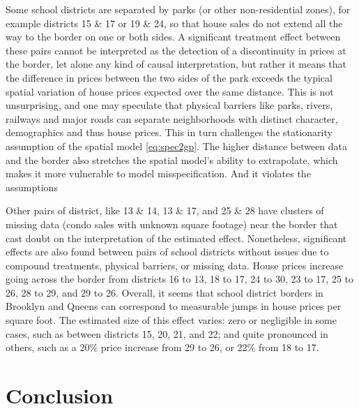 \documentclass[letter,12pt]{article}
\begin{document}
Some school districts are separated by parks (or other non-residential zones), for example districts 15 \& 17 or 19 \& 24, so that house sales do not extend all the way to the border on one or both sides.
A significant treatment effect between these pairs cannot be interpreted as the detection of a discontinuity in prices at the border, let alone any kind of causal interpretation, but rather it means that the difference in prices between the two sides of the park exceeds the typical spatial variation of house prices expected over the same distance.
This is not unsurprising, and one may speculate that physical barriers like parks, rivers, railways and major roads can separate neighborhoods with distinct character, demographics and thus house prices.
This in turn challenges the stationarity assumption of the spatial model \eqref{eq:spec2gp}.
The higher distance between data and the border also stretches the spatial model's ability to extrapolate, which makes it more vulnerable to model misspecification.
And it violates the assumptions




Other pairs of district, like 13 \& 14, 13 \& 17, and 25 \& 28 have clusters of missing data (condo sales with unknown square footage) near the border that cast doubt on the interpretation of the estimated effect.
Nonetheless, significant effects are also found between pairs of school districts without issues due to compound treatments, physical barriers, or missing data.
House prices increase going across the border from districts 16 to 13, 18 to 17, 24 to 30, 23 to 17, 25 to 26, 28 to 29, and 29 to 26.
Overall, it seems that school district borders in Brooklyn and Queens can correspond to measurable jumps in house prices per square foot.
The estimated size of this effect varies: zero or negligible in some cases, such as between districts 15, 20, 21, and 22; and quite pronounced in others, such as a 20\% price increase from 29 to 26, or 22\% from 18 to 17.



\hypertarget{conclusion}{%
\section{Conclusion}\label{conclusion}}
\end{document}
